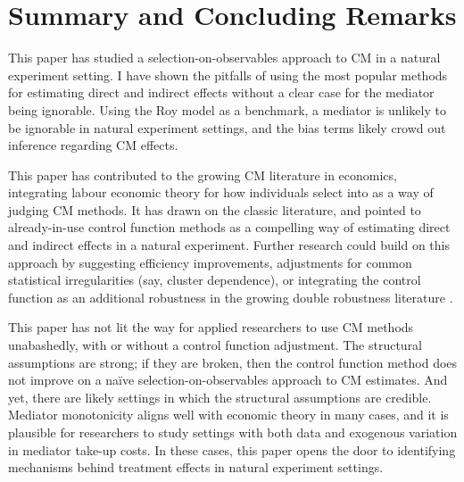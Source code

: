 \section{Summary and Concluding Remarks}
\label{sec:conclusion}

This paper has studied a selection-on-observables approach to CM in a natural experiment setting.
I have shown the pitfalls of using the most popular methods for estimating direct and indirect effects without a clear case for the mediator being ignorable.
Using the Roy model as a benchmark, a mediator is unlikely to be ignorable in natural experiment settings, and the bias terms likely crowd out inference regarding CM effects.

This paper has contributed to the growing CM literature in economics, integrating labour economic theory for how individuals select into as a way of judging CM methods.
It has drawn on the classic literature, and pointed to already-in-use control function methods as a compelling way of estimating direct and indirect effects in a natural experiment.
Further research could build on this approach by suggesting efficiency improvements, adjustments for common statistical irregularities (say, cluster dependence), or integrating the control function as an additional robustness in the growing double robustness literature \citep{huber2019review,bia2024double}.

This paper has not lit the way for applied researchers to use CM methods unabashedly, with or without a control function adjustment.
The structural assumptions are strong; if they are broken, then the control function method does not improve on a na\"ive selection-on-observables approach to CM estimates.
And yet, there are likely settings in which the structural assumptions are credible.
Mediator monotonicity aligns well with economic theory in many cases, and it is plausible for researchers to study settings with both data and exogenous variation in mediator take-up costs.
In these cases, this paper opens the door to identifying mechanisms behind treatment effects in natural experiment settings.
